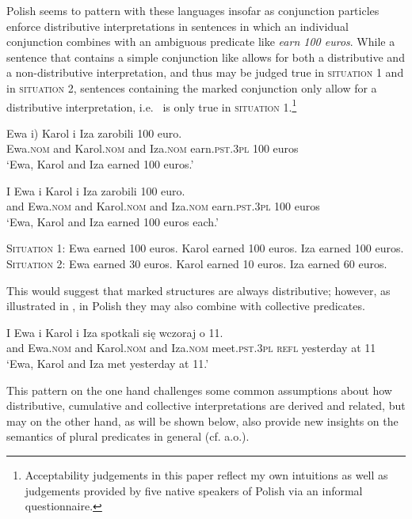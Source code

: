 \documentclass[output=paper]{langscibook}
\begin{document}
\noindent Polish seems to pattern with these languages insofar as conjunction particles enforce distributive interpretations in sentences in which an individual conjunction combines with an ambiguous predicate like \textit{earn 100 euros}. While a sentence that contains a simple conjunction like  allows for both a distributive and a non-distributive interpretation, and thus may be judged true in \textsc{situation 1} and in \textsc{situation 2}, sentences containing the marked conjunction only allow for a distributive interpretation, i.e.~ is only true in \textsc{situation 1}.\footnote{Acceptability judgements in this paper reflect my own intuitions as well as judgements provided by five native speakers of Polish via an informal questionnaire.}

\ea\label{ros:amb1} \gll Ewa \minsp{(} i) Karol i Iza zarobili 100 euro. \\
Ewa.\textsc{nom} {} and Karol.\textsc{nom} and Iza.\textsc{nom} earn.\textsc{pst.3pl} 100 euros \\
\glt `Ewa, Karol and Iza earned 100 euros.'
\z 

\ea\label{ros:amb2} \gll I Ewa i Karol i Iza zarobili 100 euro. \\
and Ewa.\textsc{nom} and Karol.\textsc{nom} and Iza.\textsc{nom} earn.\textsc{pst.3pl} 100 euros \\
\glt `Ewa, Karol and Iza earned 100 euros each.'
\z 

\ea
\ea \textsc{Situation 1:} Ewa earned 100 euros. Karol earned 100 euros. Iza earned 100 euros.
\ex \textsc{Situation 2:} Ewa earned 30 euros. Karol earned 10 euros. Iza earned 60 euros.
\z\z

\noindent This would suggest that marked structures are always distributive; however, as illustrated in , in Polish they may also combine with collective predicates.

\ea\label{ros:coll} \gll I Ewa i Karol i Iza spotkali się wczoraj o 11. \\
and Ewa.\textsc{nom} and Karol.\textsc{nom} and Iza.\textsc{nom} meet.\textsc{pst.3pl} \textsc{refl} yesterday at 11 \\
\glt `Ewa, Karol and Iza met yesterday at 11.'
\z 

\noindent This pattern on the one hand challenges some common assumptions about how distributive, cumulative and collective interpretations are derived and related, but may on the other hand, as will be shown below, also provide new insights on the semantics of plural predicates in general (cf. \citealt{Dowty:1987, Schein:1993, Schein:2017, Winter:2002, Hackl:2002, Champollion:2010} a.o.).
\end{document}
